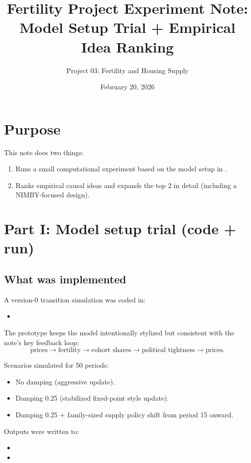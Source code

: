 \documentclass[11pt]{article}
\title{Fertility Project Experiment Note: Model Setup Trial + Empirical Idea Ranking}
\author{Project 03: Fertility and Housing Supply}
\date{February 20, 2026}
\begin{document}
\maketitle

\section*{Purpose}
This note does two things:
\begin{enumerate}
\item Runs a small computational experiment based on the model setup in
.
\item Ranks empirical causal ideas and expands the top 2 in detail (including a NIMBY-focused design).
\end{enumerate}

\section{Part I: Model setup trial (code + run)}

\subsection*{What was implemented}
A version-0 transition simulation was coded in:
\begin{itemize}
\item {}
\end{itemize}
The prototype keeps the model intentionally stylized but consistent with the note's key feedback loop:
\[
\text{prices} \rightarrow \text{fertility} \rightarrow \text{cohort shares} \rightarrow \text{political tightness} \rightarrow \text{prices}.
\]

Scenarios simulated for 50 periods:
\begin{itemize}
\item No damping (aggressive update).
\item Damping 0.25 (stabilized fixed-point style update).
\item Damping 0.25 + family-sized supply policy shift from period 15 onward.
\end{itemize}

Outputs were written to:
\begin{itemize}
\item {}
\item {}
\end{itemize}
\end{document}

